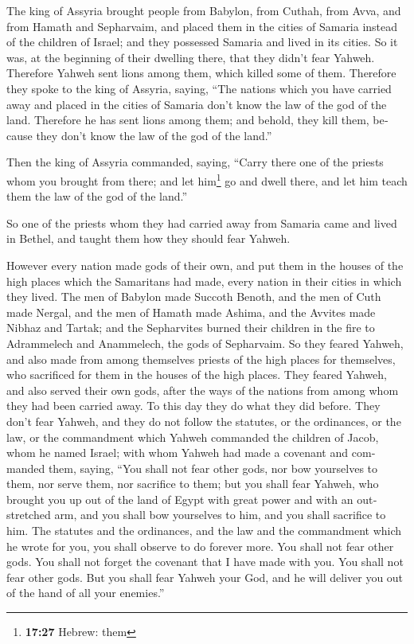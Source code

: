 \begin{paracol}{2}
\begin{otherlanguage}{english}
 The king of Assyria brought people from Babylon, from
Cuthah, from Avva, and from Hamath and Sepharvaim, and placed them in
the cities of Samaria instead of the children of Israel; and they
possessed Samaria and lived in its cities.  So it was, at
the beginning of their dwelling there, that they didn't fear Yahweh.
Therefore Yahweh sent lions among them, which killed some of them.
 Therefore they spoke to the king of Assyria, saying,
``The nations which you have carried away and placed in the cities of
Samaria don't know the law of the god of the land. Therefore he has sent
lions among them; and behold, they kill them, because they don't know
the law of the god of the land.''

 Then the king of Assyria commanded, saying, ``Carry
there one of the priests whom you brought from there; and let
him\footnote{\textbf{17:27} Hebrew: them} go and dwell there, and let
him teach them the law of the god of the land.''

 So one of the priests whom they had carried away from
Samaria came and lived in Bethel, and taught them how they should fear
Yahweh.

 However every nation made gods of their own, and put
them in the houses of the high places which the Samaritans had made,
every nation in their cities in which they lived.  The
men of Babylon made Succoth Benoth, and the men of Cuth made Nergal, and
the men of Hamath made Ashima,  and the Avvites made
Nibhaz and Tartak; and the Sepharvites burned their children in the fire
to Adrammelech and Anammelech, the gods of Sepharvaim. 
So they feared Yahweh, and also made from among themselves priests of
the high places for themselves, who sacrificed for them in the houses of
the high places.  They feared Yahweh, and also served
their own gods, after the ways of the nations from among whom they had
been carried away.  To this day they do what they did
before. They don't fear Yahweh, and they do not follow the statutes, or
the ordinances, or the law, or the commandment which Yahweh commanded
the children of Jacob, whom he named Israel;  with whom
Yahweh had made a covenant and commanded them, saying, ``You shall not
fear other gods, nor bow yourselves to them, nor serve them, nor
sacrifice to them;  but you shall fear Yahweh, who
brought you up out of the land of Egypt with great power and with an
outstretched arm, and you shall bow yourselves to him, and you shall
sacrifice to him.  The statutes and the ordinances, and
the law and the commandment which he wrote for you, you shall observe to
do forever more. You shall not fear other gods.  You
shall not forget the covenant that I have made with you. You shall not
fear other gods.  But you shall fear Yahweh your God, and
he will deliver you out of the hand of all your enemies.''


\end{otherlanguage}
\end{paracol}
